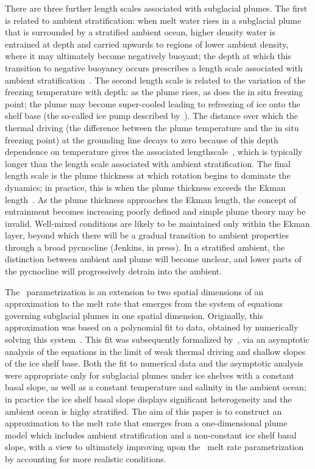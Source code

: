 \documentclass{jfm}
\begin{document}
There are three further length scales associated with subglacial plumes. The first is related to ambient stratification: when melt water rises in a subglacial plume that is surrounded by a stratified ambient ocean, higher density water is entrained at depth and carried upwards to regions of lower ambient density, where it may ultimately become negatively buoyant; the depth at which this transition to negative buoyancy occurs prescribes a length scale associated with ambient stratification~\citep{Magorrian2016JGeoResOcean}. The second length scale is related to the variation of the freezing temperature with depth: as the plume rises, as does the in situ freezing point; the plume may become super-cooled leading to refreezing of ice onto the shelf base (the so-called ice pump described by~\cite{Lewis1986JGeophysResOceans}). The distance over which the thermal driving (the difference between the plume temperature and the in situ freezing point) at the grounding line decays to zero because of this depth dependence on temperature gives the associated lengthscale~\citep{LaneSerff1995JGeophysResOceans}, which is typically longer than the length scale associated with ambient stratification. The final length scale is the plume thickness at which rotation begins to dominate the dynamics; in practice, this is when the plume thickness exceeds the Ekman length~\citep{Jenkins2011JPhysOcean}. As the plume thickness approaches the Ekman length, the concept of entrainment becomes increasing poorly defined and simple plume theory may be invalid.  Well-mixed conditions are likely to be maintained only within the Ekman layer, beyond which there will be a gradual transition to ambient properties through a broad pycnocline (Jenkins, in press).  In a stratified ambient, the distinction between ambient and plume will become unclear, and lower parts of the pycnocline will progressively detrain into the ambient.

The~\cite{Lazeroms2018TheCryo} parametrization is an extension to two spatial dimensions of an approximation to the melt rate that emerges from the system of equations governing subglacial plumes in one spatial dimension. Originally, this approximation was based on a polynomial fit to data, obtained by numerically solving this system~\citep{Jenkins2014scaling}. This fit was subsequently formalized by~\cite{Lazeroms2019JPhysOcean}, via an asymptotic analysis of the equations in the limit of weak thermal driving and shallow slopes of the ice shelf base. Both the fit to numerical data and the asymptotic analysis were appropriate only for subglacial plumes under ice shelves with a constant basal slope, as well as a constant temperature and salinity in the ambient ocean; in practice the ice shelf basal slope displays significant heterogeneity and the ambient ocean is highy stratified. The aim of this paper is to construct an approximation to the melt rate that emerges from a one-dimensional plume model which includes ambient stratification and a non-constant ice shelf basal slope, with a view to ultimately improving upon the~\cite{Lazeroms2018TheCryo} melt rate parametrization by accounting for more realistic conditions.
\end{document}
